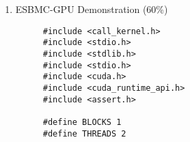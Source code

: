 \documentclass{llncs}
\begin{document}
\begin{enumerate}
\begin{itemize}
\begin{itemize}
      \end{itemize}
  \end{itemize}
  \item ESBMC-GPU Demonstration (60\%)
\\



\begin{figure} [htb]
\centering
\begin{minipage}{\textwidth}
\begin{lstlisting}
#include <call_kernel.h>
#include <stdio.h>
#include <stdlib.h>
#include <stdio.h>
#include <cuda.h>
#include <cuda_runtime_api.h>
#include <assert.h>

#define BLOCKS 1
#define THREADS 2


\end{lstlisting}
\end{minipage}
\end{figure}
\end{enumerate}
\end{document}
